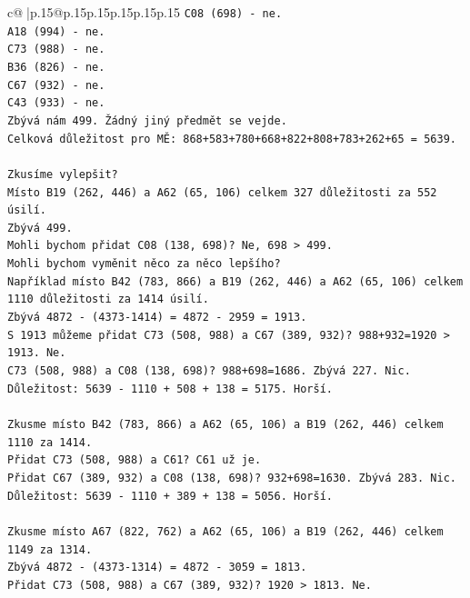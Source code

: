 \documentclass{article}
\begin{document}
{\begin{supertabular}{c@{$\;$}|p{.15\linewidth}@{}p{.15\linewidth}p{.15\linewidth}p{.15\linewidth}p{.15\linewidth}p{.15\linewidth}}
{{{\texttt{C08 (698) {-} ne.} \\
\texttt{A18 (994) {-} ne.} \\
\texttt{C73 (988) {-} ne.} \\
\texttt{B36 (826) {-} ne.} \\
\texttt{C67 (932) {-} ne.} \\
\texttt{C43 (933) {-} ne.} \\
\texttt{Zbývá nám 499. Žádný jiný předmět se vejde.} \\
\texttt{Celková důležitost pro MĚ: 868+583+780+668+822+808+783+262+65 = 5639.} \\
\\ 
\texttt{Zkusíme vylepšit?} \\
\texttt{Místo B19 (262, 446) a A62 (65, 106) celkem 327 důležitosti za 552 úsilí.} \\
\texttt{Zbývá 499.} \\
\texttt{Mohli bychom přidat C08 (138, 698)? Ne, 698 > 499.} \\
\texttt{Mohli bychom vyměnit něco za něco lepšího?} \\
\texttt{Například místo B42 (783, 866) a B19 (262, 446) a A62 (65, 106) celkem 1110 důležitosti za 1414 úsilí.} \\
\texttt{Zbývá 4872 {-} (4373{-}1414) = 4872 {-} 2959 = 1913.} \\
\texttt{S 1913 můžeme přidat C73 (508, 988) a C67 (389, 932)? 988+932=1920 > 1913. Ne.} \\
\texttt{C73 (508, 988) a C08 (138, 698)? 988+698=1686. Zbývá 227. Nic.} \\
\texttt{Důležitost: 5639 {-} 1110 + 508 + 138 = 5175. Horší.} \\
\\ 
\texttt{Zkusme místo B42 (783, 866) a A62 (65, 106) a B19 (262, 446) celkem 1110 za 1414.} \\
\texttt{Přidat C73 (508, 988) a C61? C61 už je.} \\
\texttt{Přidat C67 (389, 932) a C08 (138, 698)? 932+698=1630. Zbývá 283. Nic.} \\
\texttt{Důležitost: 5639 {-} 1110 + 389 + 138 = 5056. Horší.} \\
\\ 
\texttt{Zkusme místo A67 (822, 762) a A62 (65, 106) a B19 (262, 446) celkem 1149 za 1314.} \\
\texttt{Zbývá 4872 {-} (4373{-}1314) = 4872 {-} 3059 = 1813.} \\
\texttt{Přidat C73 (508, 988) a C67 (389, 932)? 1920 > 1813. Ne.} \\
}}}
\end{supertabular}}
\end{document}

